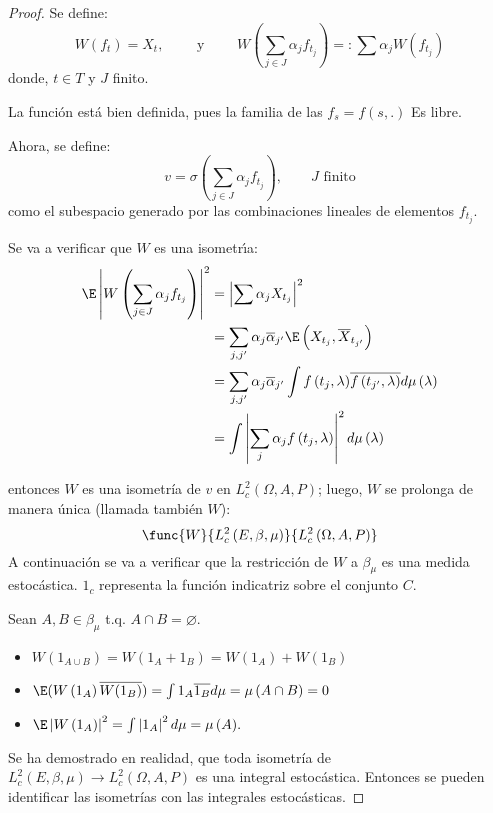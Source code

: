 \begin{proof}
 
Se define:
\[
W\left( f_{t} \right)=X_{t},\qquad \text{ y }\qquad W\left( \sum_{j\in J}{\alpha_{j}f_{t_{j}}} \right)=:\sum {\alpha_{j}W\left( f_{t_{j}} \right)} 
\]
donde, $t\in T$ y $J$ finito. 

La funci\'{o}n est\'{a} bien definida, pues la familia de las $f_{s}=f\left(s,. \right)$ Es libre.

Ahora, se define: 
\[
v=\sigma \left( \sum_{j\in J} {\alpha_{j}f_{t_{j}}} 
\right),\qquad J\text{ finito}
\]
como el subespacio generado por las combinaciones lineales de elementos $f_{t_{j}}$.\newline

Se va a verificar que $W$ es una isometr\'{\i}a:
\begin{align*}
 \E\left| W\left( \sum_{j\in J} {\alpha_{j}f_{t_{j}}} \right) \right|^{2}
	&= \left| \sum {\alpha_{j}X_{t_{j}}} \right|^{2}\\
	&=\sum_{j,j'} {\alpha_{j}\overline{\alpha }_{j'}} \E\left( X_{t_{j}},\overline{X}_{t_{j'}} \right)\\
	&=\sum_{j,j'} {\alpha_{j}\overline{\alpha }_{j'}} \int {f\left(t_{j},\lambda \right)} \overline{f\left( t_{j'},\lambda \right)}d\mu \left( \lambda \right)\\
	&=\int {\left| \sum_j {\alpha_{j}f\left( t_{j},\lambda \right)} \right|^{2}d\mu \left( \lambda \right)} 
\end{align*}

entonces $W$ es una isometr\'{i}a de $v$ en $L_{c}^{2}\left(\Omega,A,P \right)$; luego, $W$ se prolonga de manera \'{u}nica (llamada tambi\'{e}n $W$):
\[
\func{W}{L_{c}^{2}\left( E,\beta ,\mu \right)}{L_{c}^{2}\left(\Omega,A,P \right)}
\]
A continuaci\'{o}n se va a verificar que la restricci\'{o}n de $W$ a $\beta_{\mu }$ es una medida estoc\'{a}stica. $1_{c}$ representa la funci\'{o}n indicatriz sobre el conjunto $C$.

Sean $A, B\in \beta_{\mu }$ t.q. $A\cap B=\varnothing$.
\begin{itemize}
\item $W\left( {1_{A\cup B} } \right)=W\left( {1_{A} +1_{B} } \right)=W\left( {1_{A} } \right)+W\left( {1_{B} } \right)$
\item $\E(W\left( {1_{A} } \right)\overline {W(1_{B} )} )=\int {1_{A} \overline {1_{B} } d\mu =\mu \left( {A\cap B} \right)=0} $
\item $\E\left| {W\left( {1_{A} } \right)} \right|^{2}=\int 
{\left| {1_{A} } \right|^{2}d\mu =\mu \left( A \right)} .$
\end{itemize}

Se ha demostrado en realidad, que toda isometr\'{i}a de $L_{c}^{2}\left( E,\beta ,\mu \right)\to L_{c}^{2}\left( \Omega ,A,P \right)$ es una integral estoc\'{a}stica. Entonces se pueden identificar las isometr\'{i}as con las integrales estoc\'{a}sticas.
\end{proof}

